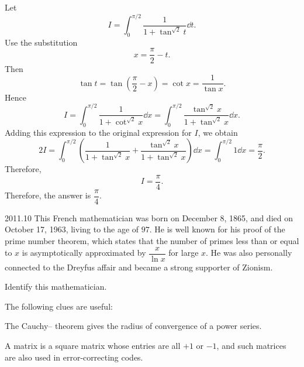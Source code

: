     \begin{solution}
        Let
        \[
            I
            =
            \int_0^{\pi/2}
            \frac{1}{1+\tan^{\sqrt{2}}t}\dd t.
        \]
        Use the substitution
        \[
            x=\frac{\pi}{2}-t.
        \]
        Then
        \[
            \tan t
            =
            \tan\left(\frac{\pi}{2}-x\right)
            =
            \cot x
            =
            \frac{1}{\tan x}.
        \]
        Hence
        \[
            I
            =
            \int_0^{\pi/2}
            \frac{1}{1+\cot^{\sqrt{2}}x}\dd x
            =
            \int_0^{\pi/2}
            \frac{\tan^{\sqrt{2}}x}{1+\tan^{\sqrt{2}}x}\dd x.
        \]
        Adding this expression to the original expression for $I$, we obtain
        \[
            2I
            =
            \int_0^{\pi/2}
            \left(
                \frac{1}{1+\tan^{\sqrt{2}}x}
                +
                \frac{\tan^{\sqrt{2}}x}{1+\tan^{\sqrt{2}}x}
            \right)\dd x
            =
            \int_0^{\pi/2}1\dd x
            =
            \frac{\pi}{2}.
        \]
        Therefore,
        \[
            I=\frac{\pi}{4}.
        \]
        Therefore, the answer is $\boxed{\dfrac{\pi}{4}}$.
    \end{solution}

    \begin{pastproblem}{2011.10}
        This French mathematician was born on December 8, 1865, and died on October 17, 1963, living
        to the age of $97$. He is well known for his proof of the prime number theorem, which states
        that the number of primes less than or equal to $x$ is asymptotically approximated by
        $\dfrac{x}{\ln x}$ for large $x$. He was also personally connected to the Dreyfus affair and
        became a strong supporter of Zionism.

        Identify this mathematician.

        \begin{hint}
            The following clues are useful:
            \begin{problemchoices}
                \item The Cauchy--\underline{\hspace{2cm}} theorem gives the radius of
                      convergence of a power series.
                \item A \underline{\hspace{2cm}} matrix is a square matrix whose entries are
                      all $+1$ or $-1$, and such matrices are also used in error-correcting codes.
            \end{problemchoices}
        \end{hint}
    \end{pastproblem}

